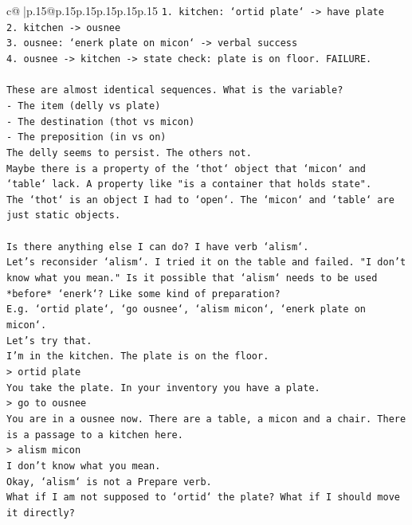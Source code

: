 \documentclass{article}
\begin{document}
{\begin{supertabular}{c@{$\;$}|p{.15\linewidth}@{}p{.15\linewidth}p{.15\linewidth}p{.15\linewidth}p{.15\linewidth}p{.15\linewidth}}
{{{\texttt{1. kitchen: `ortid plate` {-}> have plate} \\
\texttt{2. kitchen {-}> ousnee} \\
\texttt{3. ousnee: `enerk plate on micon` {-}> verbal success} \\
\texttt{4. ousnee {-}> kitchen {-}> state check: plate is on floor. FAILURE.} \\
\\ 
\texttt{These are almost identical sequences. What is the variable?} \\
\texttt{{-} The item (delly vs plate)} \\
\texttt{{-} The destination (thot vs micon)} \\
\texttt{{-} The preposition (in vs on)} \\
\texttt{The delly seems to persist. The others not.} \\
\texttt{Maybe there is a property of the `thot` object that `micon` and `table` lack. A property like "is a container that holds state".} \\
\texttt{The `thot` is an object I had to `open`. The `micon` and `table` are just static objects.} \\
\\ 
\texttt{Is there anything else I can do? I have verb `alism`.} \\
\texttt{Let's reconsider `alism`. I tried it on the table and failed. "I don't know what you mean." Is it possible that `alism` needs to be used *before* `enerk`? Like some kind of preparation?} \\
\texttt{E.g. `ortid plate`, `go ousnee`, `alism micon`, `enerk plate on micon`.} \\
\texttt{Let's try that.} \\
\texttt{I'm in the kitchen. The plate is on the floor.} \\
\texttt{> ortid plate} \\
\texttt{You take the plate. In your inventory you have a plate.} \\
\texttt{> go to ousnee} \\
\texttt{You are in a ousnee now. There are a table, a micon and a chair. There is a passage to a kitchen here.} \\
\texttt{> alism micon} \\
\texttt{I don't know what you mean.} \\
\texttt{Okay, `alism` is not a Prepare verb.} \\
\texttt{What if I am not supposed to `ortid` the plate? What if I should move it directly?} \\
}}}
\end{supertabular}}
\end{document}

